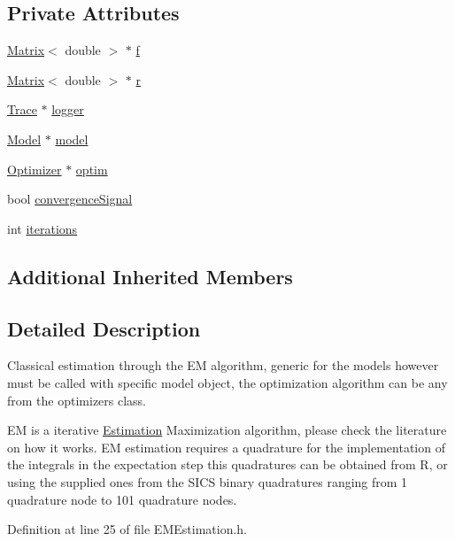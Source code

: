 \subsection*{Private Attributes}
\begin{DoxyCompactItemize}
\item 
\hyperlink{singletonMatrix}{Matrix}$<$ double $>$ $\ast$ \hyperlink{classEMEstimation_a4ad566123ad607b791d56990f9dd096d}{f}
\item 
\hyperlink{singletonMatrix}{Matrix}$<$ double $>$ $\ast$ \hyperlink{classEMEstimation_a426db380391c487206521631156d7eb6}{r}
\item 
\hyperlink{classTrace}{Trace} $\ast$ \hyperlink{classEMEstimation_a77ab33231a9baa8c5a2ceb48534137a0}{logger}
\item 
\hyperlink{classModel}{Model} $\ast$ \hyperlink{classEMEstimation_ad7a5d7459c7c0632a1aa3917fd7f3ba0}{model}
\item 
\hyperlink{classOptimizer}{Optimizer} $\ast$ \hyperlink{classEMEstimation_abbabf603bb09b6338114dd53aef5bd8a}{optim}
\item 
bool \hyperlink{classEMEstimation_aaa1a979767c171c5d33ee1ac77838ac2}{convergence\+Signal}
\item 
int \hyperlink{classEMEstimation_ad6086e6784a5c651e6d5ad45a0c84d11}{iterations}
\end{DoxyCompactItemize}
\subsection*{Additional Inherited Members}


\subsection{Detailed Description}
Classical estimation through the E\+M algorithm, generic for the models however must be called with specific model object, the optimization algorithm can be any from the optimizers class. 

E\+M is a iterative \hyperlink{classEstimation}{Estimation} Maximization algorithm, please check the literature on how it works. E\+M estimation requires a quadrature for the implementation of the integrals in the expectation step this quadratures can be obtained from R, or using the supplied ones from the S\+I\+C\+S binary quadratures ranging from 1 quadrature node to 101 quadrature nodes. 

Definition at line 25 of file E\+M\+Estimation.\+h.



